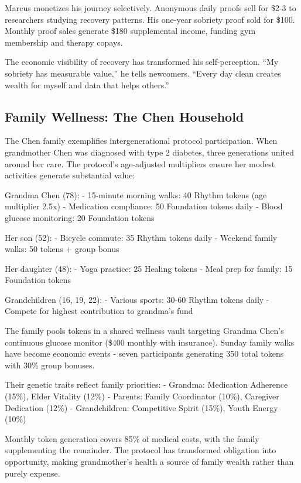 \documentclass[11pt,letterpaper]{article}
\begin{document}
Marcus monetizes his journey selectively. Anonymous daily proofs sell for \$2-3 to researchers studying recovery patterns. His one-year sobriety proof sold for \$100. Monthly proof sales generate \$180 supplemental income, funding gym membership and therapy copays.

The economic visibility of recovery has transformed his self-perception. ``My sobriety has measurable value,'' he tells newcomers. ``Every day clean creates wealth for myself and data that helps others.''

\subsection{Family Wellness: The Chen Household}

The Chen family exemplifies intergenerational protocol participation. When grandmother Chen was diagnosed with type 2 diabetes, three generations united around her care. The protocol's age-adjusted multipliers ensure her modest activities generate substantial value:

Grandma Chen (78):
- 15-minute morning walks: 40 Rhythm tokens (age multiplier 2.5x)
- Medication compliance: 50 Foundation tokens daily
- Blood glucose monitoring: 20 Foundation tokens

Her son (52):
- Bicycle commute: 35 Rhythm tokens daily
- Weekend family walks: 50 tokens + group bonus

Her daughter (48):
- Yoga practice: 25 Healing tokens
- Meal prep for family: 15 Foundation tokens

Grandchildren (16, 19, 22):
- Various sports: 30-60 Rhythm tokens daily
- Compete for highest contribution to grandma's fund

The family pools tokens in a shared wellness vault targeting Grandma Chen's continuous glucose monitor (\$400 monthly with insurance). Sunday family walks have become economic events - seven participants generating 350 total tokens with 30\% group bonuses.

Their genetic traits reflect family priorities:
- Grandma: Medication Adherence (15\%), Elder Vitality (12\%)
- Parents: Family Coordinator (10\%), Caregiver Dedication (12\%)
- Grandchildren: Competitive Spirit (15\%), Youth Energy (10\%)

Monthly token generation covers 85\% of medical costs, with the family supplementing the remainder. The protocol has transformed obligation into opportunity, making grandmother's health a source of family wealth rather than purely expense.
\end{document}
